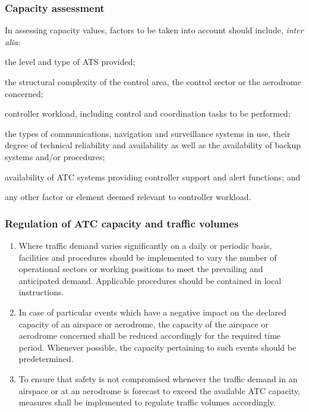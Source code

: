 \subsubsection{Capacity assessment}

In assessing capacity values, factors to be taken into account should include, \textit{inter alia}:

\begin{enumalph}
    \item the level and type of ATS provided;
    \item the structural complexity of the control area, the control sector or the aerodrome concerned;
    \item controller workload, including control and coordination tasks to be performed;
    \item the types of communications, navigation and surveillance systems in use, their degree of technical reliability and availability as well as the availability of backup systems and/or procedures;
    \item availability of ATC systems providing controller support and alert functions; and
    \item any other factor or element deemed relevant to controller workload.
\end{enumalph}


\subsubsection{Regulation of ATC capacity and traffic volumes}

\begin{enumerate}
    \item Where traffic demand varies significantly on a daily or periodic basis, facilities and procedures should be implemented to vary the number of operational sectors or working positions to meet the prevailing and anticipated demand. Applicable procedures should be contained in local instructions.
    \item In case of particular events which have a negative impact on the declared capacity of an airspace or aerodrome, the capacity of the airspace or aerodrome concerned shall be reduced accordingly for the required time period. Whenever possible, the capacity pertaining to such events should be predetermined.
    \item To ensure that safety is not compromised whenever the traffic demand in an airspace or at an aerodrome is forecast to exceed the available ATC capacity, measures shall be implemented to regulate traffic volumes accordingly.
\end{enumerate}

